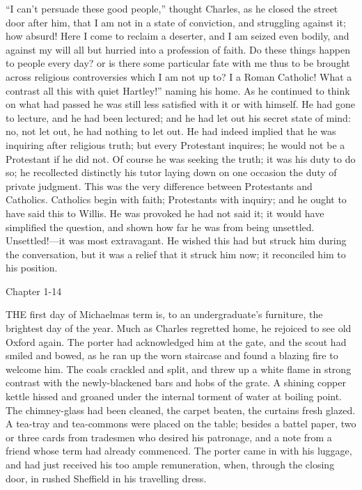 ``I can't persuade these good people,'' thought Charles, as
he closed the street door after him, that I am not in a state of
conviction, and struggling against it; how absurd! Here I come to
reclaim a deserter, and I am seized even bodily, and against my will
all but hurried into a profession of faith. Do these things happen to
people every day? or is there some particular fate with me thus to be
brought across religious controversies which I am not up to? I a Roman
Catholic! What a contrast all this with quiet Hartley!'' naming
his home. As he continued to think on what had passed he was still
less satisfied with it or with himself. He had gone to lecture, and he
had been lectured; and he had let out his secret state of mind: no,
not let out, he had nothing to let out. He had indeed implied that he
was inquiring after religious truth; but every Protestant inquires; he
would not be a Protestant if he did not. Of course he was seeking the
truth; it was his duty to do so; he recollected distinctly his tutor
laying down on one occasion the duty of private judgment. This was the
very difference between Protestants and Catholics. Catholics begin
with faith; Protestants with inquiry; and he ought to have said this
to Willis. He was provoked he had not said it; it would have
simplified the question, and shown how far he was from being
unsettled. Unsettled!—it was most extravagant. He wished this had
but struck him during the conversation, but it was a relief that it
struck him now; it reconciled him to his position.

Chapter 1-14


THE first day of Michaelmas term is, to
an undergraduate's furniture, the brightest day of the year. Much as
Charles regretted home, he rejoiced to see old Oxford again. The
porter had acknowledged him at the gate, and the scout had smiled and
bowed, as he ran up the worn staircase and found a blazing fire to
welcome him. The coals crackled and split, and threw up a white flame
in strong contrast with the newly-blackened bars and hobs of the
grate. A shining copper kettle hissed and groaned under the internal
torment of water at boiling point. The chimney-glass had been cleaned,
the carpet beaten, the curtains fresh glazed. A tea-tray and
tea-commons were placed on the table; besides a battel paper, two or
three cards from tradesmen who desired his patronage, and a note from
a friend whose term had already commenced. The porter came in with his
luggage, and had just received his too ample remuneration, when,
through the closing door, in rushed Sheffield in his travelling dress.

